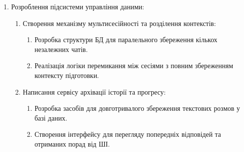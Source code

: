 \begin{enumerate}
  \begin{enumerate}
  \def\labelenumii{\arabic{enumii}.}
  \item
    Написання сервісу оцінювання відповідей:

    \begin{enumerate}
    \def\labelenumiii{\arabic{enumiii}.}
    \item
      Розробка алгоритмів перевірки технічної точності та логічності
      викладу.
    \item
      Створення системи автоматичного виявлення помилок у відповідях.
    \end{enumerate}
  \item
    Розроблення модуля формування персоналізованих звітів:

    \begin{enumerate}
    \def\labelenumiii{\arabic{enumiii}.}
    \item
      Реалізація сервісу генерації фінальної оцінки за 10-бальною
      шкалою.
    \item
      Створення функціоналу для виведення списку рекомендованих тем для
      доопрацювання.
    \end{enumerate}
  \end{enumerate}
\item
  Розроблення підсистеми управління даними:

  \begin{enumerate}
  \def\labelenumii{\arabic{enumii}.}
  \item
    Створення механізму мультисесійності та розділення контекстів:

    \begin{enumerate}
    \def\labelenumiii{\arabic{enumiii}.}
    \item
      Розробка структури БД для паралельного збереження кількох
      незалежних чатів.
    \item
      Реалізація логіки перемикання між сесіями з повним збереженням
      контексту підготовки.
    \end{enumerate}
  \item
    Написання сервісу архівації історії та прогресу:

    \begin{enumerate}
    \def\labelenumiii{\arabic{enumiii}.}
    \item
      Розробка засобів для довготривалого збереження текстових розмов у
      базі даних.
    \item
      Створення інтерфейсу для перегляду попередніх відповідей та
      отриманих порад від ШІ.
    \end{enumerate}
  \end{enumerate}
\end{enumerate}


